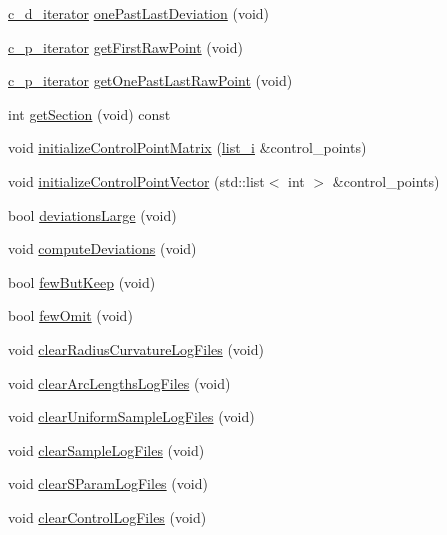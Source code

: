 \begin{CompactItemize}
\item 
\hyperlink{parameter_8h_76617663fb8c2b14cf698a47a4d07926}{c\_\-d\_\-iterator} \hyperlink{classContour_62766dd4545b50f6698d9d858da50e04}{onePastLastDeviation} (void)
\item 
\hyperlink{parameter_8h_d367c52cb5a031e4bc21ba9af7d6ee47}{c\_\-p\_\-iterator} \hyperlink{classContour_10b4970b043435029e202fd31717f3dd}{getFirstRawPoint} (void)
\item 
\hyperlink{parameter_8h_d367c52cb5a031e4bc21ba9af7d6ee47}{c\_\-p\_\-iterator} \hyperlink{classContour_b624fa91f7317166c00148135c715705}{getOnePastLastRawPoint} (void)
\item 
int \hyperlink{classContour_5f40f2e08cc648c714aca5b3763ab03c}{getSection} (void) const 
\item 
void \hyperlink{classContour_b8f0605a0056419df472cc1cb207ac30}{initializeControlPointMatrix} (\hyperlink{contour_8h_48cca362cb388dfdb3f8df5441d03717}{list\_\-i} \&control\_\-points)
\item 
void \hyperlink{classContour_2edee74efc68a14664ba378010e59a80}{initializeControlPointVector} (std::list$<$ int $>$ \&control\_\-points)
\item 
bool \hyperlink{classContour_5ab12f5bbf33221b340fda2d3c244b27}{deviationsLarge} (void)
\item 
void \hyperlink{classContour_2b4e79e18f6468763669052d312235e8}{computeDeviations} (void)
\item 
bool \hyperlink{classContour_b8df5352cb0220e352a455ea21a8cd3c}{fewButKeep} (void)
\item 
bool \hyperlink{classContour_d548a8000efd6af7dcf3b80f32395499}{fewOmit} (void)
\item 
void \hyperlink{classContour_291821fec6939f1b6111cac28b89d369}{clearRadiusCurvatureLogFiles} (void)
\item 
void \hyperlink{classContour_63a12b810dd16fd79d733c07aaf574f4}{clearArcLengthsLogFiles} (void)
\item 
void \hyperlink{classContour_df18fdf2ea3bb8d78d2f305ab047d5a6}{clearUniformSampleLogFiles} (void)
\item 
void \hyperlink{classContour_c68248cf6e54b4baf426bf5a47f5b894}{clearSampleLogFiles} (void)
\item 
void \hyperlink{classContour_07f79c4a923c8589f8b201151bde2202}{clearSParamLogFiles} (void)
\item 
void \hyperlink{classContour_bc87646ea6d6df9b49001597f57af4e7}{clearControlLogFiles} (void)
\end{CompactItemize}


